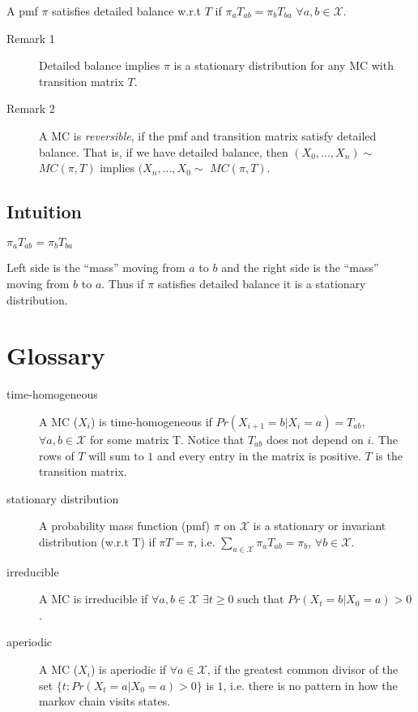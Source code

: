\documentclass{article}
\begin{document}
	 A pmf $\pi$ satisfies detailed balance w.r.t $T$ if 
	 $\pi_aT_{ab}=\pi_bT_{ba}$ $\forall a,b \in \mathcal{X}$. 

	 \begin{description}
	 	\item[Remark 1] Detailed balance implies $\pi$ is a stationary
	 	distribution for any MC with transition matrix $T$. 

	 	\item[Remark 2] A MC is \emph{reversible}, if the pmf and 
	 	transition matrix satisfy detailed balance. That is, if
	 	we have detailed balance, then $(X_0,...,X_n) \sim$ 
	 	$MC(\pi,T)$ implies $(X_n,...,X_0 \sim$ $MC(\pi,T)$.
	 \end{description}

	 \subsection*{Intuition}
	 $\pi_aT_{ab}=\pi_bT_{ba}$

	 Left side is the ``mass'' moving from $a$ to $b$ and the right
	 side is the ``mass'' moving from $b$ to $a$. Thus if $\pi$ 
	 satisfies detailed balance it is a stationary distribution.


	\section*{Glossary}
	
	\begin{description}
		\item[time-homogeneous] A MC ($X_i$) is time-homogeneous if 
		$Pr(X_{i+1}=b|X_i=a) = T_{ab}$, $\forall a,b \in \mathcal{X}$
		for some matrix T. Notice that $T_{ab}$ does not depend on $i$. 
		The rows of $T$ will sum to $1$ and every entry in the matrix is
		positive. $T$ is the transition matrix.

		\item[stationary distribution] A probability mass function (pmf) 
		$\pi$ on $\mathcal{X}$ is a stationary or invariant distribution 
		(w.r.t T) if $\pi T=\pi$, i.e. 
		$\sum_{a \in \mathcal{X}}\pi_aT_{ab}=\pi_b$, $\forall b \in \mathcal{X}$.

		\item[irreducible] A MC is irreducible if 
		$\forall a,b \in \mathcal{X}$ $\exists t \geq 0$ such that 
		$Pr(X_t=b|X_0=a) > 0$. 

		\item[aperiodic] A MC ($X_i$) is aperiodic if 
		$\forall a \in \mathcal{X}$, if the greatest common divisor
		of the set $\{ t : Pr(X_t=a|X_0=a) > 0 \}$ is $1$, i.e. there
		is no pattern in how the markov chain visits states.
	\end{description}
\end{document}
